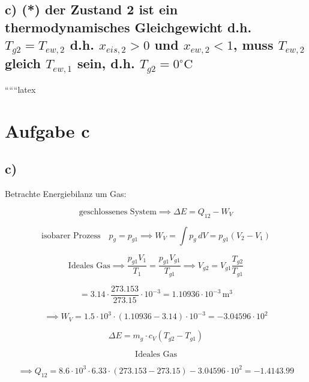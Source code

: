 \subsection*{c) (*) der Zustand 2 ist ein thermodynamisches Gleichgewicht d.h. $T_{g2} = T_{ew,2}$ d.h. $x_{eis,2} > 0$ und $x_{ew,2} < 1$, muss $T_{ew,2}$ gleich $T_{ew,1}$ sein, d.h. $T_{g2} = 0^\circ \text{C}$}

``````latex

\section*{Aufgabe c}



\subsection*{c)}

Betrachte Energiebilanz um Gas:

\[
\text{geschlossenes System} \implies \Delta E = Q_{12} - W_V
\]

\[
\text{isobarer Prozess} \quad p_g = p_{g1} \implies W_V = \int p_g \, dV = p_{g1} (V_2 - V_1)
\]

\[
\text{Ideales Gas} \implies \frac{p_{g1} V_1}{T_1} = \frac{p_{g1} V_{g1}}{T_{g1}} \implies V_{g2} = V_{g1} \frac{T_{g2}}{T_{g1}}
\]

\[
= 3.14 \cdot \frac{273.153}{273.15} \cdot 10^{-3} = 1.10936 \cdot 10^{-3} \, \text{m}^3
\]

\[
\implies W_V = 1.5 \cdot 10^3 \cdot (1.10936 - 3.14) \cdot 10^{-3} = -3.04596 \cdot 10^2
\]

\[
\Delta E = m_g \cdot c_V (T_{g2} - T_{g1})
\]

\[
\text{Ideales Gas}
\]

\[
\implies Q_{12} = 8.6 \cdot 10^3 \cdot 6.33 \cdot (273.153 - 273.15) - 3.04596 \cdot 10^2 = -1.4143.99
\]